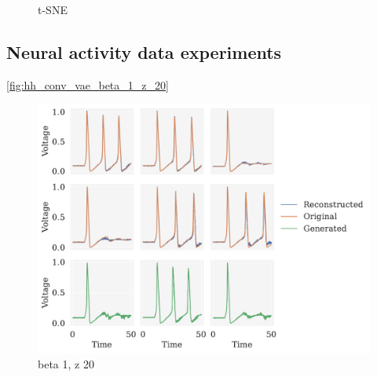 \begin{figure}[!htb]
\qquad
{}
\caption{t-SNE }
\label{fig:tsne_beta_vae_bmnist}
\end{figure}

\FloatBarrier
\subsection{Neural activity data experiments}

\autoref{fig:hh_conv_vae_beta_1_z_20}

\begin{figure}[!htb]
\begin{center}\includegraphics[scale=0.75]{latex/figures/hh_conv_vae_beta_1_z_20.pdf}
\end{center}
\caption{beta 1, z 20}
\label{fig:hh_conv_vae_beta_1_z_20}
\end{figure}

